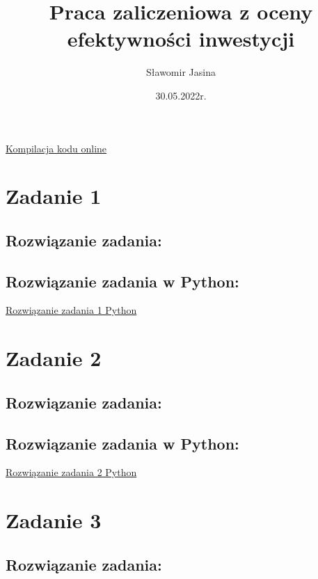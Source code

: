 \documentclass{article}
\title{Praca zaliczeniowa z oceny efektywności inwestycji}
\author{Sławomir Jasina}
\date{30.05.2022r.}
\begin{document}
	\maketitle
	\newpage
	\tableofcontents
	\newpage
	
	\href{https://github.com/slaw999999999/OEI/blob/main/README.md}{Kompilacja kodu online}
	
	
	\vspace*{1,1cm} 
	\section*{Zadanie 1}
	

	\subsection*{Rozwiązanie zadania:}
	
	
	\subsection*{Rozwiązanie zadania w Python:}
	\href{https://github.com/slaw999999999/OEI/blob/main/Zadanie1.ipynb}{Rozwiązanie zadania 1 Python}
	
	
	
	\newpage
	\section*{Zadanie 2}
	
	
	\subsection*{Rozwiązanie zadania:}
	
	
	\subsection*{Rozwiązanie zadania w Python:}
	\href{https://github.com/slaw999999999/OEI/blob/main/Zadanie1.ipynb}{Rozwiązanie zadania 2 Python}
	
	\newpage
	\section*{Zadanie 3}
	
	
	\subsection*{Rozwiązanie zadania:}
	
\end{document}

